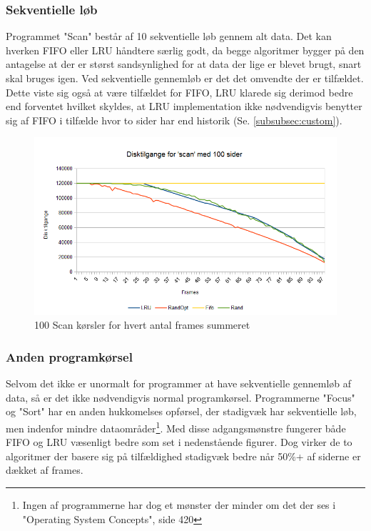 \subsubsection{Sekventielle løb}
Programmet "Scan" består af 10 sekventielle løb gennem alt data. Det kan hverken FIFO eller LRU håndtere særlig godt, da begge algoritmer bygger på den antagelse at der er størst sandsynlighed for at data der lige er blevet brugt, snart skal bruges igen. Ved sekventielle gennemløb er det det omvendte der er tilfældet. Dette viste sig også at være tilfældet for FIFO, LRU klarede sig derimod bedre end forventet hvilket skyldes, at LRU implementation ikke nødvendigvis benytter sig af FIFO i tilfælde hvor to sider har end historik (Se. \ref{subsubsec:custom}).

\begin{figure}[ht]
\centerline{\includegraphics[scale=0.8]{graph/stat_scan}}
\caption{100 Scan kørsler for hvert antal frames summeret}
\label{fig:scan}
\end{figure}

\subsubsection{Anden programkørsel}
Selvom det ikke er unormalt for programmer at have sekventielle gennemløb af data, så er det ikke nødvendigvis normal programkørsel. Programmerne "Focus" og "Sort" har en anden hukkomelses opførsel, der stadigvæk har sekventielle løb, men indenfor mindre dataområder\footnote{Ingen af programmerne har dog et mønster der minder om det der ses i "Operating System Concepts", side 420}. Med disse adgangsmønstre fungerer både FIFO og LRU væsenligt bedre som set i nedenstående figurer. Dog virker de to algoritmer der basere sig på tilfældighed stadigvæk bedre når 50\%+ af siderne er dækket af frames.

